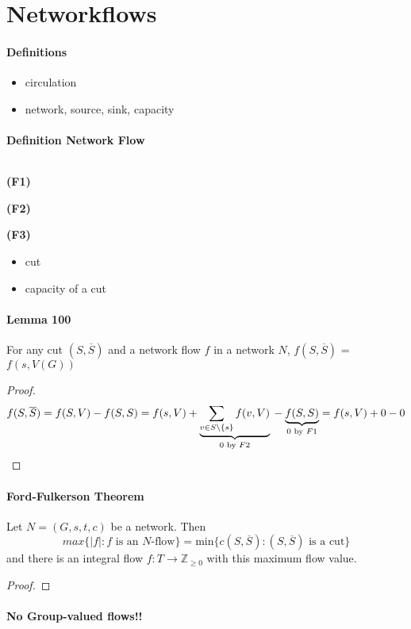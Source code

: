 \section{Networkflows}

\paragraph{Definitions}
\begin{itemize}
    \item circulation
    \item network, source, sink, capacity
\end{itemize}

\paragraph{Definition Network Flow} $ $

\smallskip \noindent
\textbf{(F1)} 

\smallskip \noindent
\textbf{(F2)}

\smallskip \noindent
\textbf{(F3)}

\begin{itemize}
    \item cut
    \item capacity of a cut
\end{itemize}

\paragraph{Lemma 100} For any cut $(S,\overline{S})$
and a network flow $f$ in a network $N$, 
$f(S,\overline{S})$ = $f(s,V(G))$
\begin{proof}
  $$
  f(S,\overline{S}) = f(S,V) - f(S,S) = f(s,V)
  + \underbrace{\sum_{v\in S\setminus\{s\}} f(v,V)}_{0 \text{ by } F2} \\
  - \underbrace{f(S,S)}_{0 \text{ by } F1}
  = f(s,V) + 0 - 0  
  $$
\end{proof}

\paragraph{Ford-Fulkerson Theorem} 
Let $N = (G,s,t,c)$ be a network. Then 
$$ max\{|f|: f \text{ is an } N\text{-flow}\} = 
\text{min}\{c(S,\overline{S}): (S,\overline{S}) \text{ is a cut}\}$$
and there is an integral flow $f: T \to \mathbb{Z}_{\geq0}$
with this maximum flow value.
\begin{proof}
    {\color{red}{TODO}}
\end{proof}

\paragraph{No Group-valued flows!!}